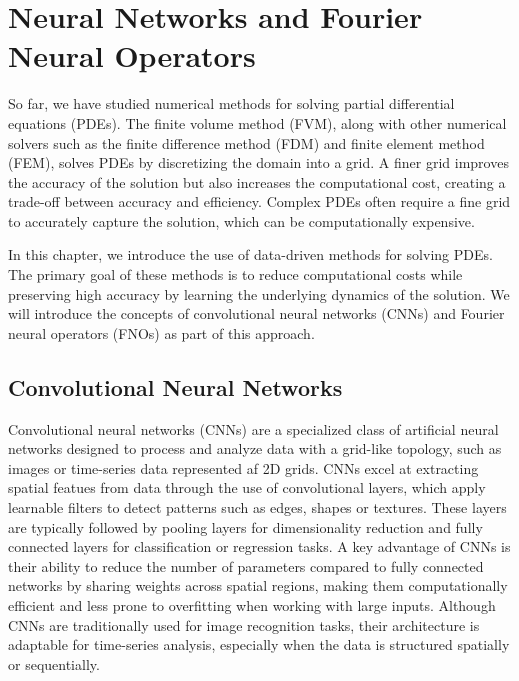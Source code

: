 \chapter{Neural Networks and Fourier Neural Operators}\label{ch:FNO+NN}
So far, we have studied numerical methods for solving partial differential equations (PDEs).
The finite volume method (FVM), along with other numerical solvers such as the finite difference method (FDM) and finite element method (FEM), solves PDEs by discretizing the domain into a grid.
A finer grid improves the accuracy of the solution but also increases the computational cost, creating a trade-off between accuracy and efficiency.
Complex PDEs often require a fine grid to accurately capture the solution, which can be computationally expensive.

In this chapter, we introduce the use of data-driven methods for solving PDEs.
The primary goal of these methods is to reduce computational costs while preserving high accuracy by learning the underlying dynamics of the solution.
We will introduce the concepts of convolutional neural networks (CNNs) and Fourier neural operators (FNOs) as part of this approach.

\section{Convolutional Neural Networks}
Convolutional neural networks (CNNs) are a specialized class of artificial neural networks designed to process and analyze data with a grid-like topology, such as images or time-series data represented af 2D grids.
CNNs excel at extracting spatial featues from data through the use of convolutional layers, which apply learnable filters to detect patterns such as edges, shapes or textures.
These layers are typically followed by pooling layers for dimensionality reduction and fully connected layers for classification or regression tasks.
A key advantage of CNNs is their ability to reduce the number of parameters compared to fully connected networks by sharing weights across spatial regions, making them computationally efficient and less prone to overfitting when working with large inputs.
Although CNNs are traditionally used for image recognition tasks, their architecture is adaptable for time-series analysis, especially when the data is structured spatially or sequentially.

